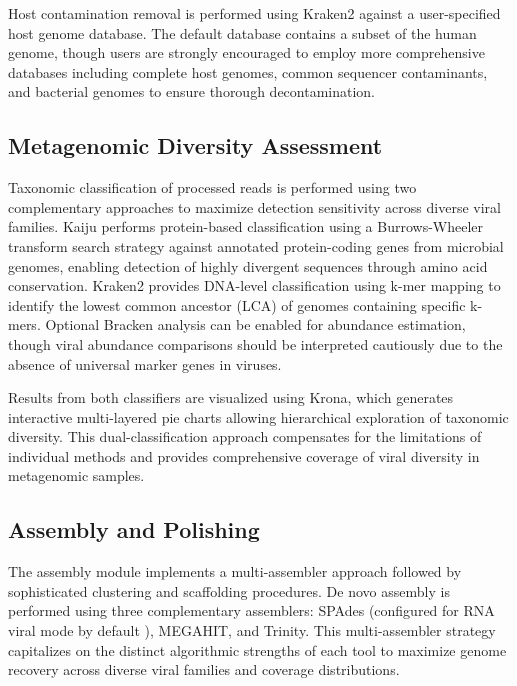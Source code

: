 \documentclass[unnumsec,webpdf,contemporary,large]{oup-authoring-template}%
\theoremstyle{thmstyleone}%
\theoremstyle{thmstyletwo}%
\theoremstyle{thmstylethree}%
\begin{document}
Host contamination removal is performed using Kraken2 \cite{Wood2019-jl} against a user-specified host genome database. The default database contains a subset of the human genome, though users are strongly encouraged to employ more comprehensive databases including complete host genomes, common sequencer contaminants, and bacterial genomes to ensure thorough decontamination.

\subsection{Metagenomic Diversity Assessment}\label{subsec_diversity}

Taxonomic classification of processed reads is performed using two complementary approaches to maximize detection sensitivity across diverse viral families. Kaiju \cite{Menzel2016-tz} performs protein-based classification using a Burrows-Wheeler transform search strategy against annotated protein-coding genes from microbial genomes, enabling detection of highly divergent sequences through amino acid conservation. Kraken2 \cite{Wood2019-jl} provides DNA-level classification using k-mer mapping to identify the lowest common ancestor (LCA) of genomes containing specific k-mers. Optional Bracken analysis can be enabled for abundance estimation, though viral abundance comparisons should be interpreted cautiously due to the absence of universal marker genes in viruses.

Results from both classifiers are visualized using Krona, which generates interactive multi-layered pie charts allowing hierarchical exploration of taxonomic diversity. This dual-classification approach compensates for the limitations of individual methods and provides comprehensive coverage of viral diversity in metagenomic samples.

\subsection{Assembly and Polishing}\label{subsec_assembly}

The assembly module implements a multi-assembler approach followed by sophisticated clustering and scaffolding procedures. De novo assembly is performed using three complementary assemblers: SPAdes \cite{Bankevich2012-lh} (configured for RNA viral mode by default \cite{Meleshko2021-gb}), MEGAHIT, and Trinity. This multi-assembler strategy capitalizes on the distinct algorithmic strengths of each tool to maximize genome recovery across diverse viral families and coverage distributions.
\end{document}
